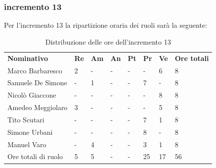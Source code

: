 \subsubsection{incremento 13}
Per l'incremento 13 la ripartizione oraria dei ruoli sarà la seguente:
\begin{center}
    \begin{table}[ht!]
        \centering
        \caption{Distribuzione delle ore dell'incremento 13}
        \vspace{5px}
        \renewcommand{\arraystretch}{1.8}
        \begin{tabular}{p{100px} p{20px} p{20px} p{20px} p{20px} p{20px} p{20px} p{50px} }
            \rowcolor{logo!70} \textbf{Nominativo} & \textbf{Re} & \textbf{Am} & \textbf{An} & \textbf{Pt} & \textbf{Pr} & \textbf{Ve} & \textbf{Ore totali} \\
            Marco Barbaresco                       & 2           & -           & -           & -           & -           & 6           & 8                   \\
            Samuele De Simone                      & -           & 1           & -           & -           & 7           & -           & 8                   \\
            Nicolò Giaccone                        & -           & -           & -           & -           & -           & 8           & 8                   \\
            Amedeo Meggiolaro                      & 3           & -           & -           & -           & -           & 5           & 8                   \\
            Tito Scutari                           & -           & -           & -           & -           & 7           & 1           & 8                   \\
            Simone Urbani                          & -           & -           & -           & -           & 8           & -           & 8                   \\
            Manuel Varo                            & -           & 4           & -           & -           & 3           & 1           & 8                   \\
            Ore totali di ruolo                    & 5           & 5           & -           & -           & 25          & 17          & 56                  \\
        \end{tabular}
    \end{table}
\end{center}
